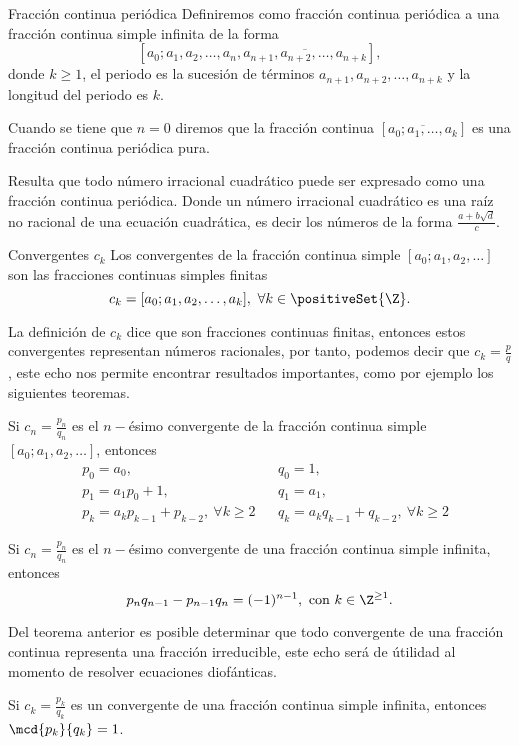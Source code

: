 \begin{definition.box}{Fracción continua periódica}{}
    Definiremos como fracción continua periódica a una fracción continua simple infinita de la forma
    \[
        [a_0; a_1, a_2, \ldots, a_n, \overline{a_{n + 1}, a_{n + 2},\ldots, a_{n + k}}],
    \]
    donde $k \geq 1$, el periodo es la sucesión de términos $a_{n + 1}, a_{n + 2},\ldots, a_{n + k}$ y la longitud del periodo es $k$.
\end{definition.box}

Cuando se tiene que $n = 0$ diremos que la fracción continua $[\overline{a_0;a_1, \ldots, a_k}]$ es una fracción continua periódica pura.

Resulta que todo número irracional cuadrático puede ser expresado como una fracción continua periódica.
Donde un número irracional cuadrático es una raíz no racional de una ecuación cuadrática, es decir los números de la forma $\frac{a + b\sqrt {d}}{c}$.

\begin{definition.box}{Convergentes $c_k$}{}
    Los convergentes de la fracción continua simple $[a_0; a_1, a_2, \ldots]$ son las fracciones continuas simples finitas
    \[
        c_k = [a_0; a_1, a_2, \ldots, a_k],\ \forall k \in \positiveSet{\Z}.
    \]
\end{definition.box}

La definición de $c_k$ dice que son fracciones continuas finitas, entonces estos convergentes representan números racionales,
por tanto, podemos decir que $c_k = \frac{p}{q}$, este echo nos permite encontrar resultados importantes, como por ejemplo los siguientes teoremas.

\begin{theorem.box}{}{}
    Si $c_n = \frac{p_n}{q_n}$ es el $n-$ésimo convergente de la fracción continua simple $[a_0; a_1, a_2, \ldots]$, entonces
    \begin{align*}
        &p_0 = a_0, && q_0 = 1,\\
        &p_1 = a_1 p_0 + 1, && q_1 = a_1,\\
        &p_k = a_k p_{k - 1} + p_{k - 2},\ \forall k \geq 2 && q_k = a_k q_{k - 1} + q_{k - 2},\ \forall k \geq 2
    \end{align*}
\end{theorem.box}

\begin{theorem.box}{}{}
    Si $c_n = \frac{p_n}{q_n}$ es el $n-$ésimo convergente de una fracción continua simple infinita, entonces
    \[
        p_n q_{n - 1} - p_{n - 1}q_n = (- 1)^{n-1}, \ \text{con}\ k \in \Z^{\geq 1}.
    \]
\end{theorem.box}
Del teorema anterior es posible determinar que todo convergente de una fracción continua representa una fracción irreducible, este echo será de útilidad al momento de resolver ecuaciones diofánticas.
\begin{corollary}
    Si $c_k = \frac{p_k}{q_k}$ es un convergente de una fracción continua simple infinita, entonces $\mcd{p_k}{q_k} = 1$.
\end{corollary}


